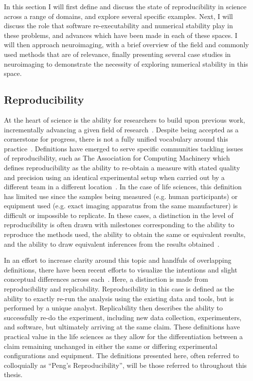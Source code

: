 In this section I will first define and discuss the state of reproducibility in science across a range of domains, and
explore several specific examples. Next, I will discuss the role that software re-executability and numerical stability
play in these problems, and advances which have been made in each of these spaces. I will then approach neuroimaging,
with a brief overview of the field and commonly used methods that are of relevance, finally presenting several case
studies in neuroimaging to demonstrate the necessity of exploring numerical stability in this space.

\subsection{Reproducibility}
At the heart of science is the ability for researchers to build upon previous work, incrementally advancing a given
field of research~\cite{salmon1999introduction,platt1964strong}. Despite being accepted as a cornerstone for progress,
there is not a fully unified vocabulary around this
practice~\cite{plesser2018reproducibility,patil2019visual,goodman2016does}. Definitions have emerged to serve specific
communities tackling issues of reproducibility, such as The Association for Computing Machinery which defines
reproducibility as the ability to re-obtain a measure with stated quality and precision using an identical experimental
setup when carried out by a different team in a different location~\cite{acm_2020}. In the case of life sciences, this
definition has limited use since the samples being measured (e.g. human participants) or equipment used (e.g. exact
imaging apparatus from the same manufacturer) is difficult or impossible to replicate. In these cases, a distinction in
the level of reproducibility is often drawn with milestones corresponding to the ability to reproduce the methods used,
the ability to obtain the same or equivalent results, and the ability to draw equivalent inferences from the results
obtained~\cite{plesser2018reproducibility}.

In an effort to increase clarity around this topic and handfuls of overlapping definitions, there have been recent
efforts to visualize the intentions and slight conceptual differences across each~\cite{patil2019visual}. Here, a
distinction is made from reproducibility and replicability. Reproducibility in this case is defined as the ability to
exactly re-run the analysis using the existing data and tools, but is performed by a unique analyst. Replicability then
describes the ability to successfully re-do the experiment, including new data collection, experimenters, and software,
but ultimately arriving at the same claim. These definitions have practical value in the life sciences as they allow for
the differentiation between a claim remaining unchanged in either the same or differing experimental configurations and
equipment. The definitions presented here, often referred to colloquially as ``Peng's Reproducibility'', will be those
referred to throughout this thesis.

